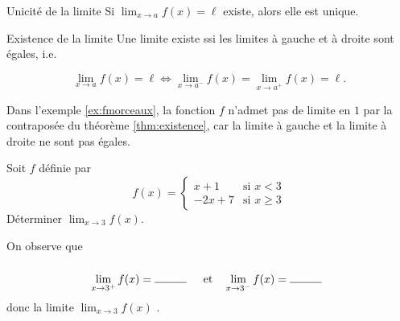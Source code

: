 \documentclass[a4paper,12pt]{article}
\begin{document}
\begin{thm}[label=thm:unicite]
	Unicité de la limite
	\tcblower
Si $\displaystyle{\lim_{x\rightarrow a}f(x)=\ell}$ existe, alors elle est unique.	
\end{thm}

\begin{thm}[label=thm:existence]
	Existence de la limite
\tcblower
Une limite existe ssi les limites à gauche et à droite sont égales, i.e.

\[\displaystyle{\lim_{x\rightarrow a}f(x)=\ell} \iff \displaystyle{\lim_{x\rightarrow a^-}f(x)}= \displaystyle{\lim_{x\rightarrow a^+}f(x)=\ell}.\]
\end{thm}
\begin{exemple}
	\tcblower
	Dans l'exemple \ref{ex:fmorceaux}, la fonction $f$ n'admet pas de limite en $1$ par la contraposée du théorème \ref{thm:existence}, car la limite à gauche et la limite à droite ne sont pas égales.  
\end{exemple}
\begin{exemple}
		\tcblower
Soit $f$ définie par \[f(x)=\begin{cases}x+1& \text{si } x<3\\ -2x+7 & \text{si } x\geq 3\end{cases}\]	
	Déterminer $\displaystyle{\lim_{x\rightarrow 3}f(x)}$. 

\begin{center}
\end{center}
 On observe que 
 \[\lim_{x\rightarrow 3^+}f(x)=\ligne{1} \quad \text{et} \quad \lim_{x\rightarrow 3^-}f(x)=\ligne{1}\]
 donc la limite $\displaystyle{\lim_{x\rightarrow 3}f(x)}$ .
\end{exemple}
\end{document}
